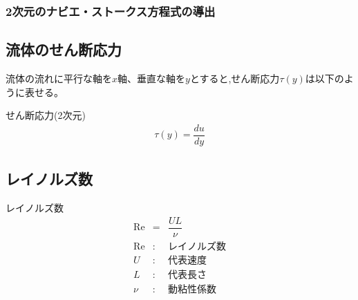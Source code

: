\documentclass[a4paper]{jsarticle}
\begin{document}
\subsubsection{2次元のナビエ・ストークス方程式の導出}
\subsection{流体のせん断応力}
流体の流れに平行な軸を$x$軸、垂直な軸を$y$とすると,せん断応力$\tau\left(y\right)$は以下のように表せる。
\begin{itembox}[l]{せん断応力(2次元)}
    \begin{eqnarray*}
        \tau\left(y\right)=\dfrac{du}{dy}
    \end{eqnarray*}
\end{itembox}
\subsection{レイノルズ数}
\begin{itembox}[l]{レイノルズ数}
    \begin{eqnarray*}
        \mathrm{Re}&=&\dfrac{UL}{\nu}\\
        \mathrm{Re} &:& レイノルズ数\\
        U &:& 代表速度\\
        L &:& 代表長さ\\
        \nu &:& 動粘性係数
    \end{eqnarray*}
\end{itembox}
\end{document}
